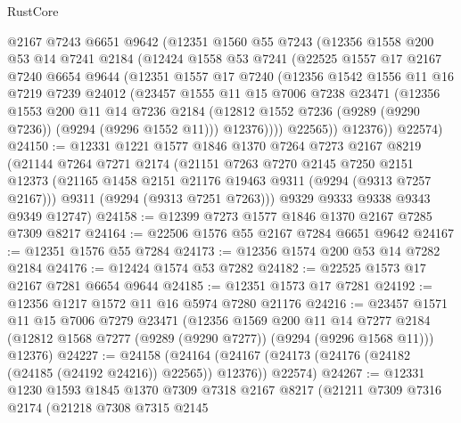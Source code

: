 \begin{lexlean}{RustCore}
\begin{coremodule}
      @2167
      @7243
      @6651
      @9642
      (@12351
        @1560
        @55
        @7243
        (@12356
          @1558
          @200
          @53
          @14
          @7241
          @2184
          (@12424
            @1558
            @53
            @7241
            (@22525
              @1557
              @17
              @2167
              @7240
              @6654
              @9644
              (@12351
                @1557
                @17
                @7240
                (@12356
                  @1542
                  @1556
                  @11
                  @16
                  @7219
                  @7239
                  @24012
                  (@23457
                    @1555
                    @11
                    @15
                    @7006
                    @7238
                    @23471
                    (@12356
                      @1553
                      @200
                      @11
                      @14
                      @7236
                      @2184
                      (@12812 @1552 @7236 (@9289 (@9290 @7236)) (@9294 (@9296 @1552 @11)))
                      @12376))))
              @22565))
          @12376))
      @22574)
@24150 := @12331
    @1221
    @1577
    @1846
    @1370
    @7264
    @7273
    @2167
    @8219
    (@21144
      @7264
      @7271
      @2174
      (@21151
        @7263
        @7270
        @2145
        @7250
        @2151
        @12373
        (@21165 @1458 @2151 @21176 @19463 @9311 (@9294 (@9313 @7257 @2167)))
        @9311
        (@9294 (@9313 @7251 @7263)))
      @9329
      @9333
      @9338
      @9343
      @9349
      @12747)
@24158 := @12399 @7273 @1577 @1846 @1370 @2167 @7285 @7309 @8217
@24164 := @22506 @1576 @55 @2167 @7284 @6651 @9642
@24167 := @12351 @1576 @55 @7284
@24173 := @12356 @1574 @200 @53 @14 @7282 @2184
@24176 := @12424 @1574 @53 @7282
@24182 := @22525 @1573 @17 @2167 @7281 @6654 @9644
@24185 := @12351 @1573 @17 @7281
@24192 := @12356 @1217 @1572 @11 @16 @5974 @7280 @21176
@24216 := @23457
    @1571
    @11
    @15
    @7006
    @7279
    @23471
    (@12356
      @1569
      @200
      @11
      @14
      @7277
      @2184
      (@12812 @1568 @7277 (@9289 (@9290 @7277)) (@9294 (@9296 @1568 @11)))
      @12376)
@24227 := @24158
    (@24164 (@24167 (@24173 (@24176 (@24182 (@24185 (@24192 @24216)) @22565)) @12376)) @22574)
@24267 := @12331
    @1230
    @1593
    @1845
    @1370
    @7309
    @7318
    @2167
    @8217
    (@21211
      @7309
      @7316
      @2174
      (@21218
        @7308
        @7315
        @2145

\end{coremodule}
\end{lexlean}
